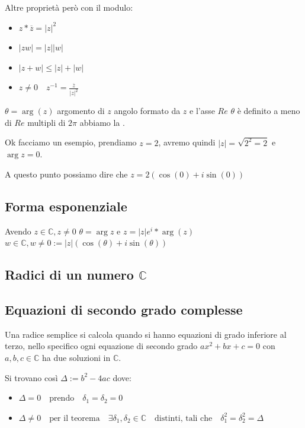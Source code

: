 \documentclass{article}
\theoremstyle{definition}
\begin{document}
Altre proprietà però con il modulo:
\begin{itemize}
        \item $z * \overline{z} =   |z|^{2}$ \\
        \item $|zw| = |z| |w|$ \\
        \item $|z+w| \le |z| + |w|$ \\
        \item $z \not = 0 \quad z^{-1} = \frac{\overline{z}}{|z|^{2}} $ \\
\end{itemize}


$\theta = \arg(z)$ argomento di $ z $  angolo formato da $ z $  e l'asse $Re$ $\theta$ è definito a meno di $Re$ multipli di $2\pi$ abbiamo la .

Ok facciamo un esempio, prendiamo $z = 2$, avremo quindi $|z| = \sqrt{2^2 = 2}$ e $\arg{z} = 0$.\par
A questo punto possiamo dire che $z = 2(\cos(0) + i\sin(0))$ \newline




\subsection{Forma esponenziale}
Avendo $z \in \mathbb{C}, z \not = 0$ \newline
$\theta = \arg z$ e  $z = | z | e^i*\arg(z)$ \newline
$w \in \mathbb{C}, w \not = 0 := |z| (\cos(\theta) + i\sin(\theta))$ \newline


\subsection{Radici di un numero $ \mathbb{C} $}


\subsection{Equazioni di secondo grado complesse}
Una radice semplice si calcola quando si hanno equazioni di grado inferiore al terzo, nello specifico ogni equazione di secondo grado $ax^2+bx+c = 0$ con $a,b,c \in \mathbb{C}$ ha due soluzioni in $\mathbb{C}$. \par
Si trovano così  $\Delta := b^2 - 4ac$ dove:
\begin{itemize}
        \item $\Delta = 0 \quad \mbox{prendo} \quad \delta_1 = \delta_2 = 0$	
        \item $\Delta \not = 0 \quad \mbox{per il teorema} \quad \exists \delta_1,\delta_2 \in \mathbb{C} \quad \mbox{distinti, tali che} \quad \delta_1^2 = \delta_2^2 = \Delta$	
\end{itemize}
\end{document}
